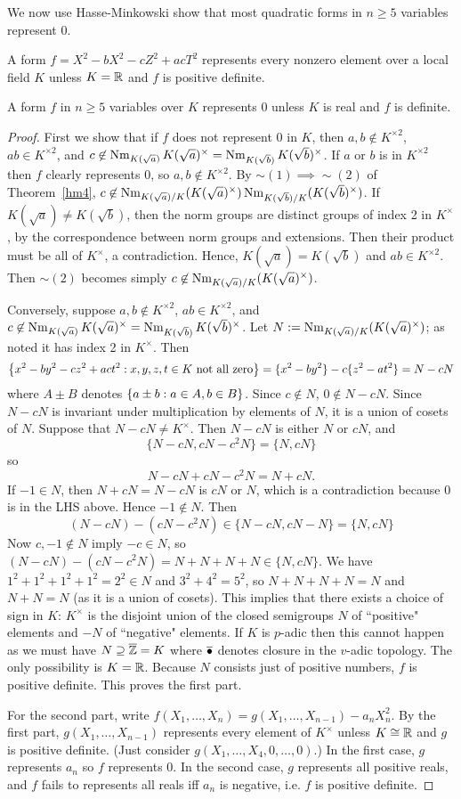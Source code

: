 We now use Hasse-Minkowski show that most quadratic forms in $n\ge 5$ variables represent 0.
\begin{lem}
A form $f=X^2-bX^2-cZ^2+acT^2$ represents every nonzero element over a local field $K$ unless $K=\mathbb{R}$ and $f$ is positive definite.

A form $f$ in $n\ge 5$ variables over $K$ represents 0 unless $K$ is real and $f$ is definite.
\end{lem}
\begin{proof}
First we show that if $f$ does not represent 0 in $K$, then $a,b\nin K^{\times 2}$, $ab\in K^{\times 2}$, and $c\not\in \operatorname{Nm}_{K(\sqrt{a})}K(\sqrt{a})^{\times}=\operatorname{Nm}_{K(\sqrt{b})}K(\sqrt{b})^{\times}$.
If $a$ or $b$ is in $K^{\times2}$ then $f$ clearly represents 0, so  $a,b\nin K^{\times 2}$. By $\sim(1)\implies \sim (2)$ of Theorem~\ref{hm4}, $c\not\in \operatorname{Nm}_{K(\sqrt{a})/K}(K(\sqrt{a})^{\times})\operatorname{Nm}_{K(\sqrt{b})/K}(K(\sqrt{b})^{\times})$. If $K(\sqrt a)\ne K(\sqrt b)$, then the norm groups are distinct groups of index 2 in $K^{\times}$, by the correspondence between norm groups and extensions. Then their product must be all of $K^{\times}$, a contradiction. Hence, $K(\sqrt a)=K(\sqrt b)$ and $ab\in K^{\times 2}$. %
Then $\sim(2)$ becomes simply $c\not\in \operatorname{Nm}_{K(\sqrt{a})/K}(K(\sqrt{a})^{\times})$.

Conversely, suppose $a,b\nin K^{\times 2}$, $ab\in K^{\times 2}$, and $c\not\in \operatorname{Nm}_{K(\sqrt{a})}K(\sqrt{a})^{\times}=\operatorname{Nm}_{K(\sqrt{b})}K(\sqrt{b})^{\times}$. Let $N:=\operatorname{Nm}_{K(\sqrt{a})/K}(K(\sqrt{a})^{\times})$; as noted it has index 2 in $K^{\times}$. Then
\[
\left\{{x^2-by^2-cz^2+act^2}:{x,y,z,t\in K\text{ not all zero}}\right\}
=
\{x^2-by^2\}-c\{z^2-at^2\}=N-cN\]
where $A\pm B$ denotes $\left\{{a\pm b}:{a\in A,b\in B}\right\}$. Since $c\nin N$, $0\nin N-cN$. Since $N-cN$ is invariant under multiplication by elements of $N$, it is a union of cosets of $N$. Suppose that $N-cN\ne K^{\times}$. Then $N-cN$ is either $N$ or $cN$, and 
\[
\{N-cN,cN-c^2N\}=\{N,cN\}
\]
so
\[
N-cN+cN-c^2N=N+cN.
\]
If $-1\in N$, then $N+cN=N-cN$ is $cN$ or $N$, which is a contradiction because 0 is in the LHS above. Hence $-1\nin N$. Then
\[
(N-cN)-(cN-c^2N)\in \{N-cN,cN-N\}=\{N,cN\}
\]
Now $c,-1\nin N$ imply $-c\in N$, so %
$(N-cN)-(cN-c^2N)=N+N+N+N\in \{N,cN\}$. We have $1^2+1^2+1^2+1^2=2^2\in N$ and $3^2+4^2=5^2$, so $N+N+N+N=N$ and $N+N=N$ (as it is a union of cosets). 
This implies that there exists a choice of sign in $K$: $K^{\times}$ is the disjoint union of the closed semigroups $N$ of ``positive" elements and $-N$ of ``negative" elements. If $K$ is $p$-adic then this cannot happen as we must have $N\supseteq \overline{\mathbb{Z}}=K$ where $\overline{\bullet}$ denotes closure in the $v$-adic topology. The only possibility is $K=\mathbb{R}$. Because $N$ consists just of positive numbers, $f$ is positive definite. This proves the first part.

For the second part, write $f(X_1,\ldots, X_n)=g(X_1,\ldots, X_{n-1})-a_nX_n^2$. By the first part, $g(X_1,\ldots, X_{n-1})$ represents every element of $K^{\times}$ unless $K\cong \mathbb{R}$ and $g$ is positive definite. (Just consider $g(X_1,\ldots, X_4,0,\ldots, 0)$.) In the first case, $g$ represents $a_n$ so $f$ represents 0. In the second case, $g$ represents all positive reals, and $f$ fails to represents all reals iff $a_n$ is negative, i.e. $f$ is positive definite.
\end{proof}
